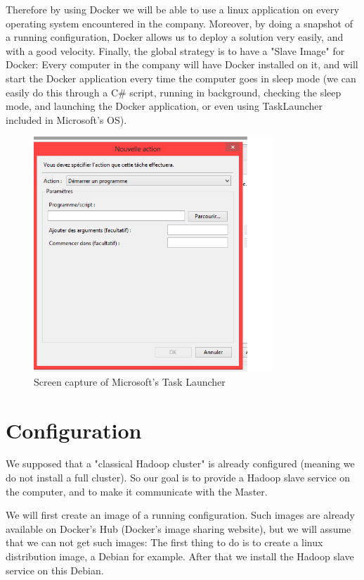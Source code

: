 \documentclass[11pt]{report} %
\begin{document}
Therefore by using Docker we will be able to use a linux application on every operating system encountered in the company.
Moreover, by doing a snapshot of a running configuration, Docker allows us to deploy a solution very easily, and with a good velocity.
Finally, the global strategy is to have a "Slave Image" for Docker:
Every computer in the company will have Docker installed on it, and will start the Docker application every time the computer goes in sleep mode (we can easily do this through a C\# script, running in background, checking the sleep mode, and launching the Docker application, or even using TaskLauncher included in Microsoft's OS).

\begin{figure}[ht!]
\centering
\includegraphics[width=90mm]{screen.png}
\caption{Screen capture of Microsoft's Task Launcher \label{overflow}}
\end{figure}

\section{Configuration}
We supposed that a "classical Hadoop cluster" is already configured (meaning we do not install a full cluster). So our goal is to provide a Hadoop slave service on the computer, and to make it communicate with the Master.

We will first create an image of a running configuration. Such images are already available on Docker's Hub (Docker's image sharing website), but we will assume that we can not get such images: 
The first thing to do is to create a linux distribution image, a Debian for example. After that we install the Hadoop slave service on this Debian.
\end{document}
